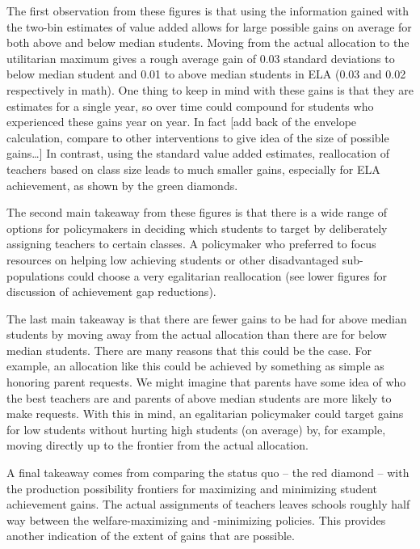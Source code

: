\documentclass{article}
\theoremstyle{definition}
\theoremstyle{definition}
\theoremstyle{definition}
\theoremstyle{definition}
\begin{document}
	The first observation from these figures is that using the information gained with the two-bin estimates of value added allows for large possible gains on average for both above and below median students. Moving from the actual allocation to the utilitarian maximum gives a rough average gain of 0.03 standard deviations to below median student and 0.01 to above median students in ELA (0.03 and 0.02 respectively in math). One thing to keep in mind with these gains is that they are estimates for a single year, so over time could compound for students who experienced these gains year on year. In fact [add back of the envelope calculation, compare to other interventions to give idea of the size of possible gains…] In contrast, using the standard value added estimates, reallocation of teachers based on class size leads to much smaller gains, especially for ELA achievement, as shown by the green diamonds.

	The second main takeaway from these figures is that there is a wide range of options for policymakers in deciding which students to target by deliberately assigning teachers to certain classes. A policymaker who preferred to focus resources on helping  low achieving students or other disadvantaged sub-populations could choose a very egalitarian reallocation (see lower figures for discussion of achievement gap reductions).

	The last main takeaway is that there are fewer gains to be had for above median students by moving away from the actual allocation than there are for below median students. There are many reasons that this could be the case. For example, an allocation like this could be achieved by something as simple as honoring parent requests. We might imagine that parents have some idea of who the best teachers are and parents of above median students are more likely to make requests. With this in mind, an egalitarian policymaker could target gains for low students without hurting high students (on average) by, for example, moving directly up to the frontier from the actual allocation.

	A final takeaway comes from comparing the status quo – the red diamond – with the production possibility frontiers for maximizing and minimizing student achievement gains. The actual assignments of teachers leaves schools roughly half way between the welfare-maximizing and -minimizing policies. This provides another indication of the extent of gains that are possible.
\end{document}
